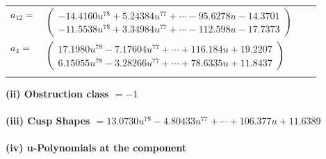 \documentclass[1p]{elsarticle_modified}
\theoremstyle{definition}
\begin{document}
\begin{tabular}{m{7pt} m{180pt} m{7pt} m{180pt} }
\flushright $a_{12}=$&$\begin{pmatrix}-14.4160 u^{78}+5.24384 u^{77}+\cdots-95.6278 u-14.3701\\-11.5538 u^{78}+3.34984 u^{77}+\cdots-112.598 u-17.7373\end{pmatrix}$ \\
\flushright $a_{4}=$&$\begin{pmatrix}17.1980 u^{78}-7.17604 u^{77}+\cdots+116.184 u+19.2207\\6.15055 u^{78}-3.28266 u^{77}+\cdots+78.6335 u+11.8437\end{pmatrix}$\\&\end{tabular}
\flushleft \textbf{(ii) Obstruction class $= -1$}\\~\\
\flushleft \textbf{(iii) Cusp Shapes $= 13.0730 u^{78}-4.80433 u^{77}+\cdots+106.377 u+11.6389$}\\~\\
\newpage\renewcommand{\arraystretch}{1}
\flushleft \textbf{(iv) u-Polynomials at the component}\newline \\
\end{document}
